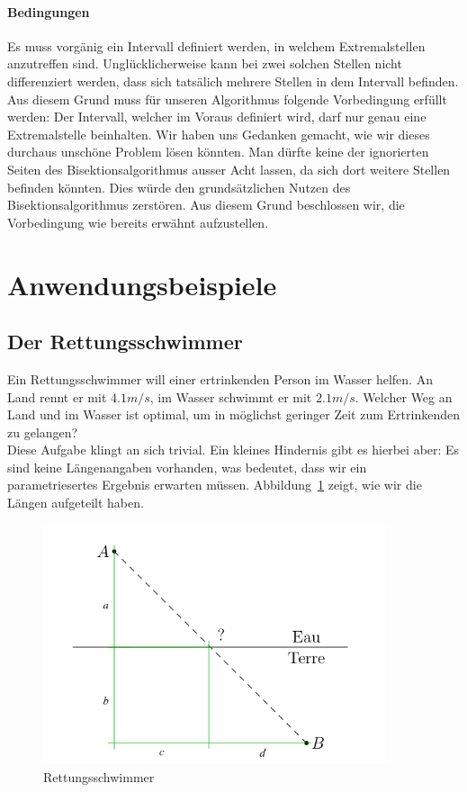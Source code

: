 \documentclass[10pt]{article}         %
\begin{document}
\paragraph{Bedingungen}
Es muss vorgänig ein Intervall definiert werden, in welchem Extremalstellen anzutreffen sind. Unglücklicherweise kann bei zwei solchen Stellen nicht differenziert werden, dass sich tatsälich mehrere Stellen in dem Intervall befinden. Aus diesem Grund muss für unseren Algorithmus folgende Vorbedingung erfüllt werden: Der Intervall, welcher im Voraus definiert wird, darf nur genau eine Extremalstelle beinhalten. Wir haben uns Gedanken gemacht, wie wir dieses durchaus unschöne Problem lösen könnten. Man dürfte keine der ignorierten Seiten des Bisektionsalgorithmus ausser Acht lassen, da sich dort weitere Stellen befinden könnten. Dies würde den grundsätzlichen Nutzen des Bisektionsalgorithmus zerstören. Aus diesem Grund beschlossen wir, die Vorbedingung wie bereits erwähnt aufzustellen.

\pagebreak
\section{Anwendungsbeispiele}
\subsection{Der Rettungsschwimmer}
Ein Rettungsschwimmer will einer ertrinkenden Person im Wasser helfen. An Land rennt er mit $4.1 m/s$, im Wasser schwimmt er mit $2.1 m/s$. Welcher Weg an Land und im Wasser ist optimal, um in möglichst geringer Zeit zum Ertrinkenden zu gelangen? \\
    Diese Aufgabe klingt an sich trivial. Ein kleines Hindernis gibt es hierbei aber: Es sind keine Längenangaben vorhanden, was bedeutet, dass wir ein parametriesertes Ergebnis erwarten müssen. Abbildung~\ref{retts} zeigt, wie wir die Längen aufgeteilt haben.

\begin{figure}[!ht]
    \centering
    \includegraphics[width=0.9\textwidth]{rettungsschwimmer}
    \caption{Rettungsschwimmer}\label{retts}
\end{figure}
\end{document}
